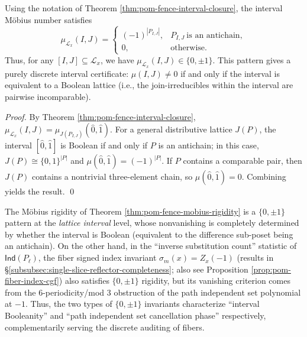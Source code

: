\begin{theorem}\label{thm:pom-fence-mobius-rigidity}
Using the notation of Theorem \ref{thm:pom-fence-interval-closure},
the interval Möbius number satisfies
\[
\mu_{\mathcal L_x}(I,J)=
\begin{cases}
(-1)^{|P_{I,J}|},& P_{I,J}\ \text{is an antichain},\\
0,& \text{otherwise}.
\end{cases}
\]
Thus, for any \([I,J]\subseteq\mathcal L_x\), we have \(\mu_{\mathcal L_x}(I,J)\in\{0,\pm 1\}\).
This pattern gives a purely discrete interval certificate: \(\mu(I,J)\neq 0\) if and only if the interval is equivalent to a Boolean lattice (i.e., the join-irreducibles within the interval are pairwise incomparable).
\end{theorem}
\begin{proof}
By Theorem \ref{thm:pom-fence-interval-closure}, \(\mu_{\mathcal L_x}(I,J)=\mu_{J(P_{I,J})}(\hat0,\hat1)\).
For a general distributive lattice \(J(P)\), the interval \([\hat0,\hat1]\) is Boolean if and only if \(P\) is an antichain;
in this case, \(J(P)\cong \{0,1\}^{|P|}\) and \(\mu(\hat0,\hat1)=(-1)^{|P|}\).
If \(P\) contains a comparable pair, then \(J(P)\) contains a nontrivial three-element chain, so \(\mu(\hat0,\hat1)=0\).
Combining yields the result. \qed
\end{proof}

\begin{remark}\label{rem:pom-fence-mobius-vs-signed-index}
The Möbius rigidity of Theorem \ref{thm:pom-fence-mobius-rigidity} is a \(\{0,\pm 1\}\) pattern at the \emph{lattice interval} level,
whose nonvanishing is completely determined by whether the interval is Boolean (equivalent to the difference sub-poset being an antichain).
On the other hand, in the ``inverse substitution count'' statistic of \(\mathsf{Ind}(P_\ell)\), the fiber signed index invariant
\(\sigma_m(x)=Z_x(-1)\) (results in \S\ref{subsubsec:single-slice-reflector-completeness}; also see Proposition \ref{prop:pom-fiber-index-cgf})
also satisfies \(\{0,\pm 1\}\) rigidity, but its vanishing criterion comes from the 6-periodicity/mod 3 obstruction of the path independent set polynomial at \(-1\).
Thus, the two types of \(\{0,\pm 1\}\) invariants characterize ``interval Booleanity'' and ``path independent set cancellation phase'' respectively, complementarily serving the discrete auditing of fibers.
\end{remark}

